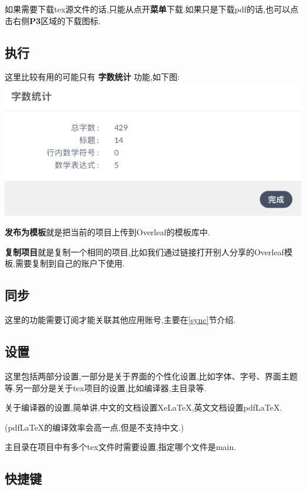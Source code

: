 \documentclass[]{ctexbook}
\begin{document}
如果需要下载tex源文件的话,只能从点开\textbf{菜单}下载.如果只是下载pdf的话,也可以点击右侧\textbf{P3}区域的下载图标.

\hypertarget{section-10}{%
\subsection{执行}\label{section-10}}

这里比较有用的可能只有 \textbf{字数统计} 功能,如下图:
\includegraphics{figure/wordcount.png}

\textbf{发布为模板}就是把当前的项目上传到Overleaf的模板库中.

\textbf{复制项目}就是复制一个相同的项目,比如我们通过链接打开别人分享的Overleaf模板,需要复制到自己的账户下使用.

\hypertarget{section-11}{%
\subsection{同步}\label{section-11}}

这里的功能需要订阅才能关联其他应用账号,主要在\ref{sync}节介绍.

\hypertarget{set}{%
\subsection{设置}\label{set}}

这里包括两部分设置,一部分是关于界面的个性化设置,比如字体、字号、界面主题等.另一部分是关于tex项目的设置,比如编译器,主目录等.

关于编译器的设置,简单讲,中文的文档设置XeLaTeX,英文文档设置pdfLaTeX.

(pdfLaTeX的编译效率会高一点,但是不支持中文.)

主目录在项目中有多个tex文件时需要设置,指定哪个文件是main.

\hypertarget{section-12}{%
\subsection{快捷键}\label{section-12}}
\end{document}
